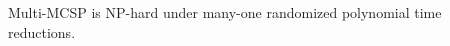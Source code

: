 \setcounter{nttheorem}{3}
\begin{nttheorem}
Multi-MCSP is NP-hard under many-one randomized polynomial time reductions.
\end{nttheorem}
